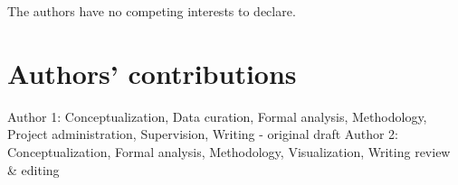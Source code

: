 \documentclass[cm,linguex]{glossa}
\begin{document}
The authors have no competing interests to declare.

\hypertarget{contrib}{%
\section*{Authors' contributions}\label{contrib}}

Author 1: Conceptualization, Data curation, Formal analysis, Methodology, Project administration, Supervision, Writing - original draft
Author 2: Conceptualization, Formal analysis, Methodology, Visualization, Writing review \& editing


\end{document}
